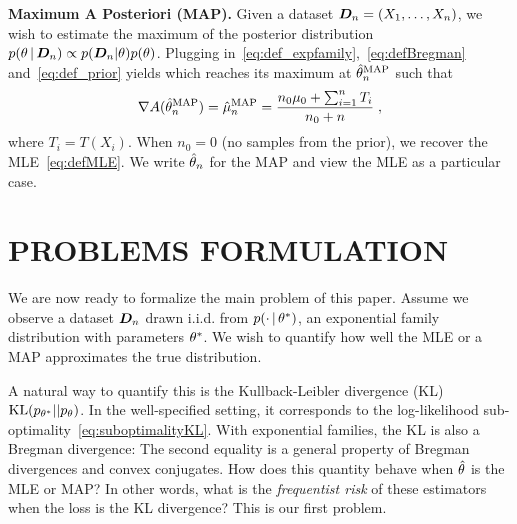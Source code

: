 {\bf Maximum A Posteriori (MAP).}
Given a dataset ${\bm{D}}_n =(X_1,\dots,X_n)$, we wish to estimate the maximum of the posterior distribution $p(\theta \,\vert\, {\bm{D}}_n) \propto p({\bm{D}}_n|\theta)p(\theta)$.
Plugging in~\eqref{eq:def_expfamily},~\eqref{eq:defBregman} and~\eqref{eq:def_prior} yields
which reaches its maximum at $\hat {\theta}_n^\text{MAP}$ such that
\begin{align}
    \nabla A(\hat {\theta}_n^\text{MAP}) = \hat {\mu}_n^\text{MAP}
    = \frac{n_0 \mu_0 + \sum_{i=1}^n T_i}{n_0+n} \; ,
    \label{eq:defMAP}
\end{align}
where $T_i=T(X_i)$.
When $n_0=0$ (no samples from the prior), we recover the MLE~\eqref{eq:defMLE}.
We write $\hat {\theta}_n$ for the MAP and view the MLE as a particular case.


\section{PROBLEMS FORMULATION}
\label{sec:problem}

We are now ready to formalize the main problem of this paper. Assume we observe a dataset ${\bm{D}}_n$ drawn i.i.d. from $p(\cdot \,\vert\,\theta^*)$, an exponential family distribution
with parameters $\theta^*$.
We wish to quantify how well the MLE or a MAP approximates the true distribution.

A natural way to quantify this is the Kullback-Leibler divergence (KL) $\mathrm{KL}(p_{\theta^*} || p_\theta)$. %
In the well-specified setting, it corresponds to the log-likelihood sub-optimality~\eqref{eq:suboptimalityKL}.
With exponential families, the KL is also a Bregman divergence:
The second equality is a general property of Bregman divergences and convex conjugates. %
How does this quantity behave when $\hat {\theta}$ is the MLE or MAP?
In other words, what is the \emph{frequentist risk} of these estimators when the loss is the KL divergence?
This is our first problem.

